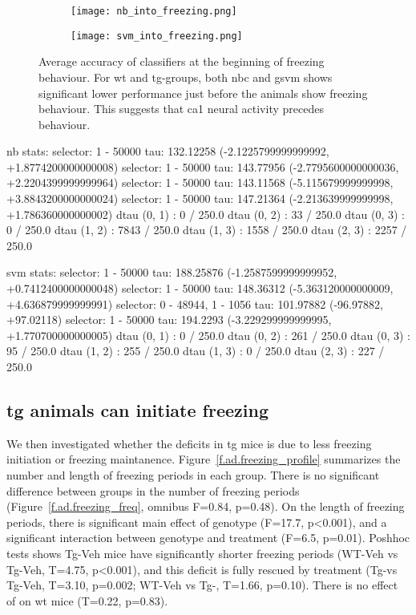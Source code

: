 \begin{figure}[h]
    \begin{subfigure}[h]{\textwidth}
        \texttt{[image: nb\_into\_freezing.png]}
        \caption{\label{f.ad.nb_into_f}}
    \end{subfigure}
    \begin{subfigure}[h]{\textwidth}
        \texttt{[image: svm\_into\_freezing.png]}
        \caption{\label{f.ad.svm_into_f}}
    \end{subfigure}
    \caption{Average accuracy of classifiers at the beginning of freezing behaviour. For \gls{wt} and \gls{tg}-\glu groups, both \gls{nbc} and \gls{gsvm} shows significant lower performance just before the animals show freezing behaviour. This suggests that \gls{ca1} neural activity precedes behaviour.\label{f.ad.into_f}}
\end{figure}

nb stats:
selector: 1 - 50000
tau: 132.12258 (-2.1225799999999992, +1.8774200000000008)
selector: 1 - 50000
tau: 143.77956 (-2.7795600000000036, +2.2204399999999964)
selector: 1 - 50000
tau: 143.11568 (-5.115679999999998, +3.8843200000000024)
selector: 1 - 50000
tau: 147.21364 (-2.213639999999998, +1.786360000000002)
dtau (0, 1) : 0 / 250.0
dtau (0, 2) : 33 / 250.0
dtau (0, 3) : 0 / 250.0
dtau (1, 2) : 7843 / 250.0
dtau (1, 3) : 1558 / 250.0
dtau (2, 3) : 2257 / 250.0

svm stats:
selector: 1 - 50000
tau: 188.25876 (-1.2587599999999952, +0.7412400000000048)
selector: 1 - 50000
tau: 148.36312 (-5.363120000000009, +4.636879999999991)
selector: 0 - 48944, 1 - 1056
tau: 101.97882 (-96.97882, +97.02118)
selector: 1 - 50000
tau: 194.2293 (-3.229299999999995, +1.770700000000005)
dtau (0, 1) : 0 / 250.0
dtau (0, 2) : 261 / 250.0
dtau (0, 3) : 95 / 250.0
dtau (1, 2) : 255 / 250.0
dtau (1, 3) : 0 / 250.0
dtau (2, 3) : 227 / 250.0



\subsection{\Gls{tg} animals can initiate freezing}
We then investigated whether the deficits in \gls{tg} mice is due to less freezing initiation or freezing maintanence. Figure~\ref{f.ad.freezing_profile} summarizes the number and length of freezing periods in each group. There is no significant difference between groups in the number of freezing periods (Figure~\ref{f.ad.freezing_freq}, omnibus F=0.84, p=0.48). On the length of freezing periods, there is significant main effect of genotype (F=17.7, p<0.001), and a significant interaction between genotype and treatment (F=6.5, p=0.01). Poshhoc tests shows Tg-Veh mice have significantly shorter freezing periods (WT-Veh vs Tg-Veh, T=4.75, p<0.001), and this deficit is fully rescued by \tglu treatment (Tg-\glu vs Tg-Veh, T=3.10, p=0.002; WT-Veh vs Tg-\glu, T=1.66, p=0.10). There is no effect of \tglu on \gls{wt} mice (T=0.22, p=0.83). 

